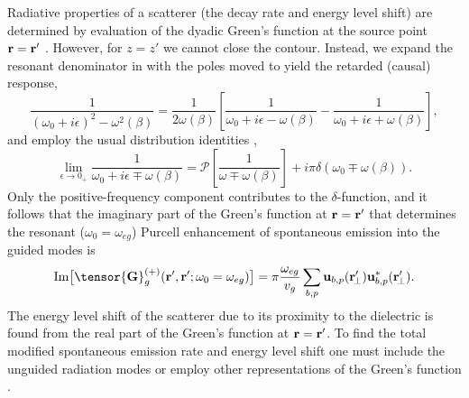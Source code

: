 \documentclass[preprint, aps,pra,onecolumn]{revtex4-1} %
\begin{document}
Radiative properties of a scatterer (the decay rate and energy level shift) are determined by evaluation of the dyadic Green's function at the source point $\mathbf{r} = \mathbf{r}'$ \cite{fussell_decay_2005}.  However, for $z=z'$ we cannot close the contour. Instead, we expand the resonant denominator in  with the poles moved to yield the retarded (causal) response,
\begin{equation}
\frac{1}{(\omega_0+i\epsilon)^2-\omega^2(\beta)}=\frac{1}{2 \omega(\beta)}\left[ \frac{1}{\omega_0+ i 
\epsilon - \omega(\beta)} - \frac{1}{\omega_0+ i \epsilon + \omega(\beta)} \right],
\end{equation}
 and employ the usual distribution identities \cite{sondergaard_general_2001},
\begin{equation}
\lim_{\epsilon \rightarrow 0_+} \frac{1}{\omega_0 + i \epsilon \mp 
\omega(\beta)}=\mathcal{P}\left[\frac{1}{\omega \mp \omega(\beta)} \right] + i \pi \delta (\omega_0 \mp 
\omega(\beta)).
\end{equation}
Only the positive-frequency component contributes to the $\delta$-function, and it follows that the imaginary part of the Green's function at $\mathbf{r} = \mathbf{r}'$ that determines the resonant ($\omega_0 = \omega_{eg}$) Purcell enhancement of spontaneous emission into the guided modes is \cite{dung_spontaneous_2000, fussell_decay_2005, chen_finite-element_2010}
	\begin{equation}\label{Eq::ImGreenLocal}
		{\rm Im} \big[\tensor{\mathbf{G}}^{(+)}_g(\br',\br'; \omega_0=\omega_{eg}) \big] = \pi \frac{\omega_{eg}}{v_g } \sum_{b, p} 
		\mathbf{u}_{b, p} (\br_{\!\perp}^\prime)\mathbf{u}^*_{b , p} (\br_{\!\perp}^\prime).
	\end{equation}
The energy level shift of the scatterer due to its proximity to the dielectric is found from the real part of the Green's function at $\mathbf{r} = \mathbf{r}'$. 
To find the total modified spontaneous emission rate and energy level shift one must include the unguided radiation modes \cite{le_kien_spontaneous_2005} or employ other representations of the Green's function \cite{klimov_spontaneous_2004}.  
\end{document}
